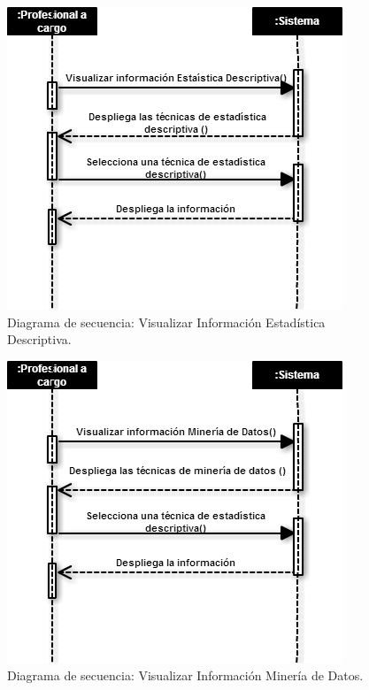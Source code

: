 \begin{figure}[htb]
	\label{dss7}
	\begin{center}
		\includegraphics[scale=0.5]{imagenes/visualizared.png}
	\end{center}
	\caption{Diagrama de secuencia: Visualizar Información Estadística Descriptiva.}
\end{figure}


\begin{figure}[htb]
	\label{dss8}
	\begin{center}
		\includegraphics[scale=0.5]{imagenes/visualizarmdd.png}
	\end{center}
	\caption{Diagrama de secuencia: Visualizar Información Minería de Datos.}
\end{figure}

